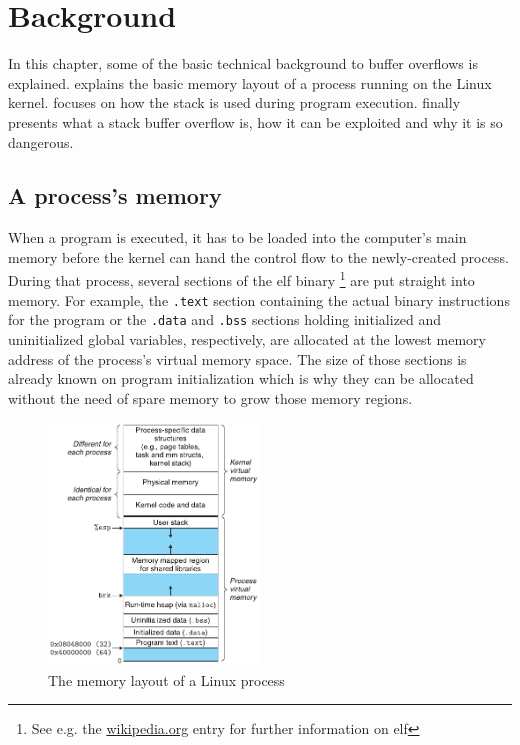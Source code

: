 \chapter{Background}
\label{chp:background}

In this chapter, some of the basic technical background to buffer overflows is explained.
 explains the basic memory layout of a process running on the Linux kernel.
 focuses on how the stack is used during program execution.
 finally presents what a stack buffer overflow is, how it can be exploited and why it is so dangerous.

\section{A process's memory}
\label{sec:process-memory}

When a program is executed, it has to be loaded into the computer's main memory before the kernel can hand the control flow to the newly-created process.
During that process, several sections of the \gls{elf} binary%
	\footnote{See e.g. the \href{https://en.wikipedia.org/wiki/Executable_and_Linkable_Format}{wikipedia.org} entry for further information on \gls{elf}}
are put straight into memory.
For example, the \texttt{.text} section containing the actual binary instructions for the program or the \texttt{.data} and \texttt{.bss} sections holding initialized and uninitialized global variables, respectively, are allocated at the lowest memory address of the process's virtual memory space.
The size of those sections is already known on program initialization which is why they can be allocated without the need of spare memory to grow those memory regions.

\begin{figure}[htb]
	\centering
	\includegraphics[width=0.5\textwidth]{figures/memory-layout}
	\caption{The memory layout of a Linux process \cite[804]{Bryant2011}}
	\label{fig:memory-layout}
\end{figure}

